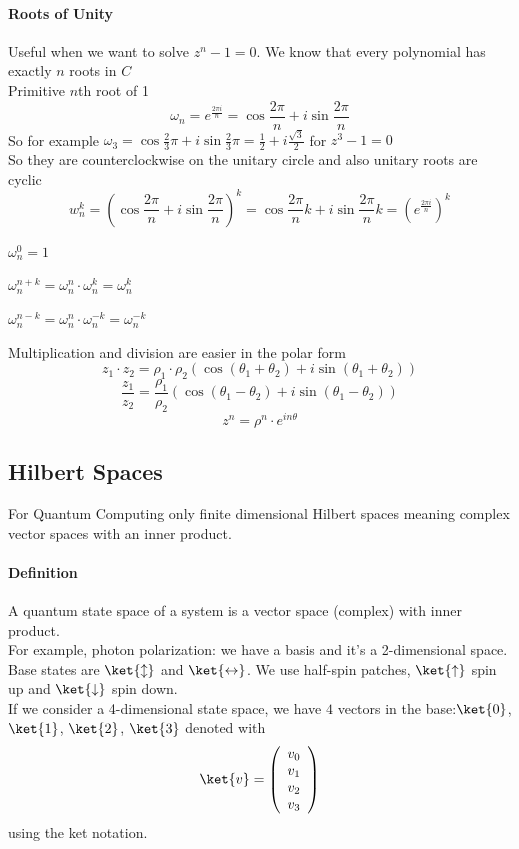 \documentclass[10pt]{report}
\begin{document}
\paragraph{Roots of Unity} Useful when we want to solve $z^n - 1 = 0$. We know that every polynomial has exactly $n$ roots in $C$\\
Primitive $n$th root of 1
$$\omega_n = e^{\frac{2\pi i}{n}} = \cos \frac{2\pi}{n} + i \sin\frac{2\pi}{n}$$
So for example $\omega_3 = \cos\frac{2}{3}\pi + i\sin\frac{2}{3}\pi = \frac{1}{2}+i\frac{\sqrt{3}}{2}$ for $z^3 - 1 = 0$\\
So they are counterclockwise on the unitary circle and also unitary roots are cyclic
$$w_n^k = (\cos \frac{2\pi}{n} + i \sin\frac{2\pi}{n})^k = \cos\frac{2\pi}{n}k + i \sin\frac{2\pi}{n}k = \left(e^{\frac{2\pi i}{n}}\right)^k$$
\begin{list}{}{}
	\item $\omega_n^0 = 1$
	\item $\omega_n^{n+k} = \omega_n^n \cdot \omega_n^k = \omega_n^k$
	\item $\omega_n^{n-k} = \omega_n^n \cdot \omega_n^{-k} = \omega_n^{-k}$
\end{list}
Multiplication and division are easier in the polar form
$$z_1\cdot z_2 = \rho_1\cdot\rho_2(\cos(\theta_1+\theta_2) + i\sin(\theta_1+\theta_2))$$
$$\frac{z_1}{z_2} = \frac{\rho_1}{\rho_2}(\cos(\theta_1-\theta_2) + i\sin(\theta_1-\theta_2))$$
$$z^n = \rho^n\cdot e^{in\theta}$$
\subsection{Hilbert Spaces} For Quantum Computing only finite dimensional Hilbert spaces meaning complex vector spaces with an inner product.
\paragraph{Definition} A quantum state space of a system is a vector space (complex) with inner product.\\
For example, photon polarization: we have a basis and it's a 2-dimensional space. Base states are $\ket{\updownarrow}$ and $\ket{\leftrightarrow}$. We use half-spin patches, $\ket{\uparrow}$ spin up and $\ket{\downarrow}$ spin down.\\
If we consider a 4-dimensional state space, we have $4$ vectors in the base:$\ket{0}$, $\ket{1}$, $\ket{2}$, $\ket{3}$ denoted with $$\ket{v}=\left(\begin{array}{c}
v_0\\v_1\\v_2\\v_3
\end{array}\right)$$ using the ket notation.
\end{document}
